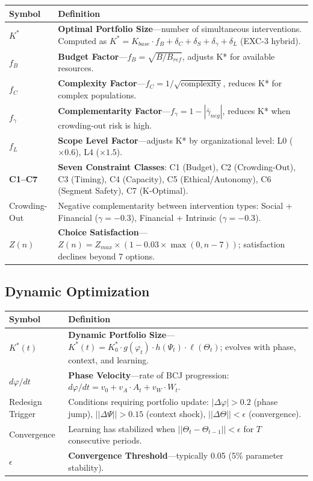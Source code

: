 \begin{longtable}{@{}p{2.8cm}p{10cm}@{}}
\toprule
\textbf{Symbol} & \textbf{Definition} \\
\midrule
\endhead
$K^*$ & \textbf{Optimal Portfolio Size}---number of simultaneous interventions. Computed as $K^* = K_{base} \cdot f_B + \delta_C + \delta_S + \delta_\gamma + \delta_L$ (EXC-3 hybrid). \\[6pt]
$f_B$ & \textbf{Budget Factor}---$f_B = \sqrt{B/B_{ref}}$, adjusts K* for available resources. \\[6pt]
$f_C$ & \textbf{Complexity Factor}---$f_C = 1/\sqrt{\text{complexity}}$, reduces K* for complex populations. \\[6pt]
$f_\gamma$ & \textbf{Complementarity Factor}---$f_\gamma = 1 - |\bar{\gamma}_{neg}|$, reduces K* when crowding-out risk is high. \\[6pt]
$f_L$ & \textbf{Scope Level Factor}---adjusts K* by organizational level: L0 ($\times 0.6$), L4 ($\times 1.5$). \\[6pt]
\textbf{C1--C7} & \textbf{Seven Constraint Classes}: C1 (Budget), C2 (Crowding-Out), C3 (Timing), C4 (Capacity), C5 (Ethical/Autonomy), C6 (Segment Safety), C7 (K-Optimal). \\[6pt]
Crowding-Out & Negative complementarity between intervention types: Social + Financial ($\gamma = -0.3$), Financial + Intrinsic ($\gamma = -0.3$). \\[6pt]
$Z(n)$ & \textbf{Choice Satisfaction}---$Z(n) = Z_{max} \times (1 - 0.03 \times \max(0, n-7))$; satisfaction declines beyond 7 options. \\
\bottomrule
\end{longtable}

\subsection{Dynamic Optimization}

\begin{longtable}{@{}p{2.8cm}p{10cm}@{}}
\toprule
\textbf{Symbol} & \textbf{Definition} \\
\midrule
\endhead
$K^*(t)$ & \textbf{Dynamic Portfolio Size}---$K^*(t) = K^*_0 \cdot g(\varphi_t) \cdot h(\Psi_t) \cdot \ell(\Theta_t)$; evolves with phase, context, and learning. \\[6pt]
$d\varphi/dt$ & \textbf{Phase Velocity}---rate of BCJ progression: $d\varphi/dt = v_0 + v_A \cdot A_t + v_W \cdot W_t$. \\[6pt]
Redesign Trigger & Conditions requiring portfolio update: $|\Delta\varphi| > 0.2$ (phase jump), $||\Delta\Psi|| > 0.15$ (context shock), $||\Delta\Theta|| < \epsilon$ (convergence). \\[6pt]
Convergence & Learning has stabilized when $||\Theta_t - \Theta_{t-1}|| < \epsilon$ for $T$ consecutive periods. \\[6pt]
$\epsilon$ & \textbf{Convergence Threshold}---typically 0.05 (5\% parameter stability). \\
\bottomrule
\end{longtable}

